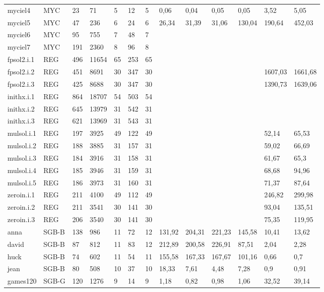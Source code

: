 \documentclass{sig-alternate}
\begin{document}
\begin{table*}[b]
{\begin{tabular}{lllllllllllll}
myciel4 & MYC & 23 & 71 & 5 & 12 & 5 & 0,06 & 0,04 & 0,05 & 0,05 & 3,52 & 5,05 \\
myciel5 & MYC & 47 & 236 & 6 & 24 & 6 & 26,34 & 31,39 & 31,06 & 130,04 & 190,64 & 452,03 \\
myciel6 & MYC & 95 & 755 & 7 & 48 & 7 &  &  &  &  &  &  \\
myciel7 & MYC & 191 & 2360 & 8 & 96 & 8 &  &  &  &  &  &  \\
fpsol2.i.1 & REG & 496 & 11654 & 65 & 253 & 65 &  &  &  &  &  &  \\
fpsol2.i.2 & REG & 451 & 8691 & 30 & 347 & 30 &  &  &  &  & 1607,03 & 1661,68 \\
fpsol2.i.3 & REG & 425 & 8688 & 30 & 347 & 30 &  &  &  &  & 1390,73 & 1639,06 \\
inithx.i.1 & REG & 864 & 18707 & 54 & 503 & 54 &  &  &  &  &  &  \\
inithx.i.2 & REG & 645 & 13979 & 31 & 542 & 31 &  &  &  &  &  &  \\
inithx.i.3 & REG & 621 & 13969 & 31 & 543 & 31 &  &  &  &  &  &  \\
mulsol.i.1 & REG & 197 & 3925 & 49 & 122 & 49 &  &  &  &  & 52,14 & 65,53 \\
mulsol.i.2 & REG & 188 & 3885 & 31 & 157 & 31 &  &  &  &  & 59,02 & 66,69 \\
mulsol.i.3 & REG & 184 & 3916 & 31 & 158 & 31 &  &  &  &  & 61,67 & 65,3 \\
mulsol.i.4 & REG & 185 & 3946 & 31 & 159 & 31 &  &  &  &  & 68,68 & 94,96 \\
mulsol.i.5 & REG & 186 & 3973 & 31 & 160 & 31 &  &  &  &  & 71,37 & 87,64 \\
zeroin.i.1 & REG & 211 & 4100 & 49 & 112 & 49 &  &  &  &  & 246,82 & 299,98 \\
zeroin.i.2 & REG & 211 & 3541 & 30 & 141 & 30 &  &  &  &  & 93,04 & 135,51 \\
zeroin.i.3 & REG & 206 & 3540 & 30 & 141 & 30 &  &  &  &  & 75,35 & 119,95 \\
anna & SGB-B & 138 & 986 & 11 & 72 & 12 & 131,92 & 204,31 & 221,23 & 145,58 & 10,41 & 13,62 \\
david & SGB-B & 87 & 812 & 11 & 83 & 12 & 212,89 & 200,58 & 226,91 & 87,51 & 2,04 & 2,28 \\
huck & SGB-B & 74 & 602 & 11 & 54 & 11 & 155,58 & 167,33 & 167,67 & 101,16 & 0,66 & 0,7 \\
jean & SGB-B & 80 & 508 & 10 & 37 & 10 & 18,33 & 7,61 & 4,48 & 7,28 & 0,9 & 0,91 \\
games120 & SGB-G & 120 & 1276 & 9 & 14 & 9 & 1,18 & 0,82 & 0,98 & 1,06 & 32,52 & 39,14 \\

\end{tabular}}
\end{table*}
\end{document}
